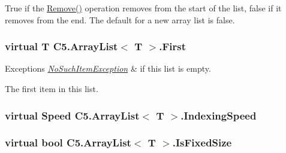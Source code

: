 True if the {\ttfamily \hyperlink{class_c5_1_1_array_list_a0bdb83e1cd5d4e6a75440f75c0fa7c9b}{Remove()}} operation removes from the start of the list, false if it removes from the end. The default for a new array list is false.\hypertarget{class_c5_1_1_array_list_afbe0bbad61f1e2ac5105fe3a73d4d9c8}{}
\subsubsection[{First}]{\setlength{\rightskip}{0pt plus 5cm}virtual T {\bf C5.\+Array\+List}$<$ T $>$.First\hspace{0.3cm}{\ttfamily [get]}}\label{class_c5_1_1_array_list_afbe0bbad61f1e2ac5105fe3a73d4d9c8}





\begin{DoxyExceptions}{Exceptions}
{\em \hyperlink{class_c5_1_1_no_such_item_exception}{No\+Such\+Item\+Exception}} & if this list is empty.\\
\hline
\end{DoxyExceptions}


The first item in this list.\hypertarget{class_c5_1_1_array_list_ae98cfa9bac197c389bbb16159a116c04}{}
\subsubsection[{Indexing\+Speed}]{\setlength{\rightskip}{0pt plus 5cm}virtual {\bf Speed} {\bf C5.\+Array\+List}$<$ T $>$.Indexing\+Speed\hspace{0.3cm}{\ttfamily [get]}}\label{class_c5_1_1_array_list_ae98cfa9bac197c389bbb16159a116c04}




\hypertarget{class_c5_1_1_array_list_a8fca7fcada0dce088679de34c1cb9c37}{}
\subsubsection[{Is\+Fixed\+Size}]{\setlength{\rightskip}{0pt plus 5cm}virtual bool {\bf C5.\+Array\+List}$<$ T $>$.Is\+Fixed\+Size\hspace{0.3cm}{\ttfamily [get]}}\label{class_c5_1_1_array_list_a8fca7fcada0dce088679de34c1cb9c37}




